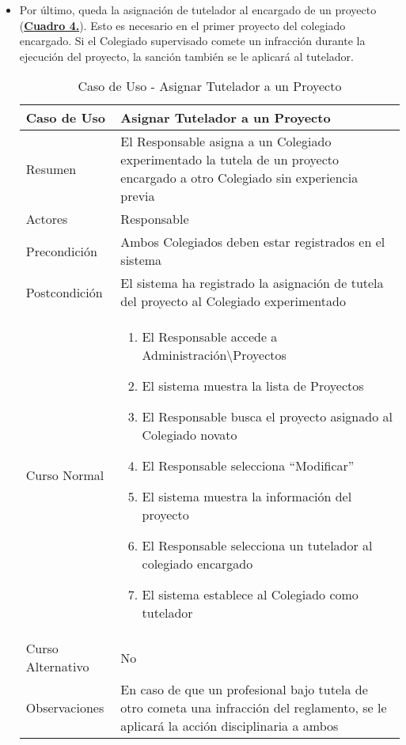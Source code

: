 \begin{itemize}
  \pagebreak
	\item \addtocounter{tabla}{1} Por último, queda la asignación de tutelador al encargado de un proyecto (\textbf{\hyperref[tab:curAsignarTutela]{Cuadro 4.}}). Esto es necesario en el primer proyecto del colegiado encargado. Si el Colegiado supervisado comete un infracción durante la ejecución del proyecto, la sanción también se le aplicará al tutelador.
		\begin{table}[!htbp]
		  \centering \addtocounter{casouso}{1}
		  \begin{tabular}{|l | p{100mm}|}
		    \textbf{Caso de Uso}  & \textbf{Asignar Tutelador a un Proyecto} \\ \hline
		    Resumen 		 & El Responsable asigna a un Colegiado experimentado la tutela de un proyecto encargado a otro Colegiado sin experiencia previa \\ \hline
		    Actores  		 & Responsable \\ \hline
		    Precondición  	 & Ambos Colegiados deben estar registrados en el sistema \\ \hline
		    Postcondición  	 & El sistema ha registrado la asignación de tutela del proyecto al Colegiado experimentado \\ \hline
		    Curso Normal   	 & \begin{enumerate}
			  \item El Responsable accede a Administración\textbackslash Proyectos
			  \item El sistema muestra la lista de Proyectos
			  \item El Responsable busca el proyecto asignado al Colegiado novato
			  \item El Responsable selecciona ``Modificar''
			  \item El sistema muestra la información del proyecto
			  \item El Responsable selecciona un tutelador al colegiado encargado
			  \item El sistema establece al Colegiado como tutelador
		    \end{enumerate}  \\ \hline
		    Curso Alternativo  & No  \\ \hline
		    Observaciones 	 & En caso de que un profesional bajo tutela de otro cometa una infracción del reglamento, se le aplicará la acción disciplinaria a ambos  \\ \hline
		  \end{tabular}
		  \caption{Caso de Uso  - Asignar Tutelador a un Proyecto}
		  \label{tab:curAsignarTutela}
		\end{table}
		\FloatBarrier
\end{itemize}



